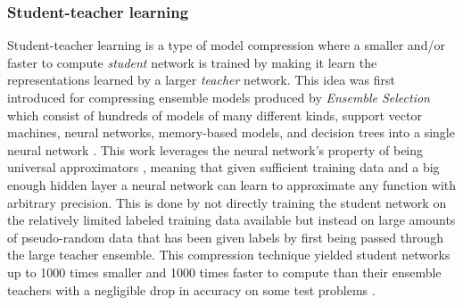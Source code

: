 \documentclass{kththesis}
\newcommand{\bibentry}[1]{\parencite{#1}}
\begin{document}
\subsubsection{Student-teacher learning}
Student-teacher learning is a type of model compression where a smaller and/or
faster to compute \emph{student} network is trained by making it learn the
representations learned by a larger \emph{teacher} network. This idea was first
introduced for compressing ensemble models produced by \emph{Ensemble Selection}
\bibentry{caruana2004ensemble} which consist of hundreds of models of many
different kinds, support vector machines, neural networks, memory-based models,
and decision trees into a single neural network \bibentry{bucilua2006model}.
This work leverages the neural network's property of being universal
approximators \bibentry{cybenko1989approximation}, meaning that given
sufficient training data and a big enough hidden layer a neural network
can learn to approximate any function with arbitrary precision. This is done by not directly
training the student network on the relatively limited labeled training data
available but instead on large amounts of pseudo-random data that has been given
labels by first being passed through the large teacher ensemble. This
compression technique yielded student networks up to 1000 times smaller and 1000
times faster to compute than their ensemble teachers with a negligible drop in accuracy
on some test problems \parencite{bucilua2006model}. 
\end{document}
